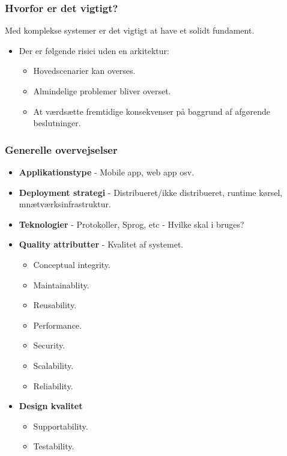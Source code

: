 \subsubsection{Hvorfor er det vigtigt?}
Med komplekse systemer er det vigtigt at have et solidt fundament.

\begin{itemize}
	\item Der er følgende risici uden en arkitektur:
	\begin{itemize}
		\item Hovedscenarier kan overses.
		\item Almindelige problemer bliver overset.
		\item At værdsætte fremtidige konsekvenser på baggrund af afgørende beslutninger.
	\end{itemize}
\end{itemize}

\subsubsection{Generelle overvejselser}
\begin{itemize}
	\item \textbf{Applikationstype} - Mobile app, web app osv.
	\item \textbf{Deployment strategi} - Distribueret/ikke distribueret, runtime kørsel, mnætværksinfrastruktur.
	\item \textbf{Teknologier} - Protokoller, Sprog, etc - Hvilke skal i bruges?
	\item \textbf{Quality attributter} - Kvalitet af systemet.
	\begin{itemize}
		\item Conceptual integrity.
		\item Maintainablity.
		\item Reusability.
		\item Performance.
		\item Security.
		\item Scalability.
		\item Reliability.
	\end{itemize}
	\item \textbf{Design kvalitet}
	\begin{itemize}
		\item Supportability.
		\item Testability.
	\end{itemize}
\end{itemize}

